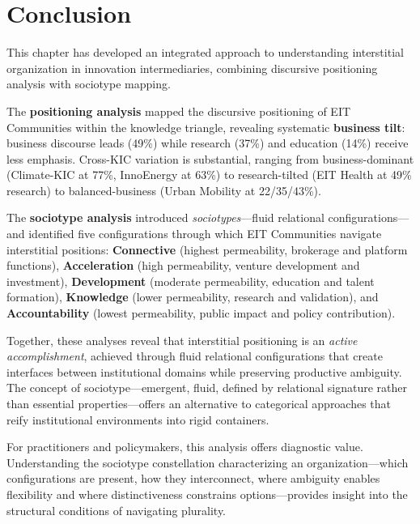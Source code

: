 \documentclass[../main.tex]{subfiles}
\begin{document}
\section{Conclusion}

This chapter has developed an integrated approach to understanding interstitial organization in innovation intermediaries, combining discursive positioning analysis with sociotype mapping.

The \textbf{positioning analysis} mapped the discursive positioning of EIT Communities within the knowledge triangle, revealing systematic \textbf{business tilt}: business discourse leads (49\%) while research (37\%) and education (14\%) receive less emphasis. Cross-KIC variation is substantial, ranging from business-dominant (Climate-KIC at 77\%, InnoEnergy at 63\%) to research-tilted (EIT Health at 49\% research) to balanced-business (Urban Mobility at 22/35/43\%).

The \textbf{sociotype analysis} introduced \textit{sociotypes}---fluid relational configurations---and identified five configurations through which EIT Communities navigate interstitial positions: \textbf{Connective} (highest permeability, brokerage and platform functions), \textbf{Acceleration} (high permeability, venture development and investment), \textbf{Development} (moderate permeability, education and talent formation), \textbf{Knowledge} (lower permeability, research and validation), and \textbf{Accountability} (lowest permeability, public impact and policy contribution).

Together, these analyses reveal that interstitial positioning is an \textit{active accomplishment}, achieved through fluid relational configurations that create interfaces between institutional domains while preserving productive ambiguity. The concept of sociotype---emergent, fluid, defined by relational signature rather than essential properties---offers an alternative to categorical approaches that reify institutional environments into rigid containers.

For practitioners and policymakers, this analysis offers diagnostic value. Understanding the sociotype constellation characterizing an organization---which configurations are present, how they interconnect, where ambiguity enables flexibility and where distinctiveness constrains options---provides insight into the structural conditions of navigating plurality.
\end{document}
